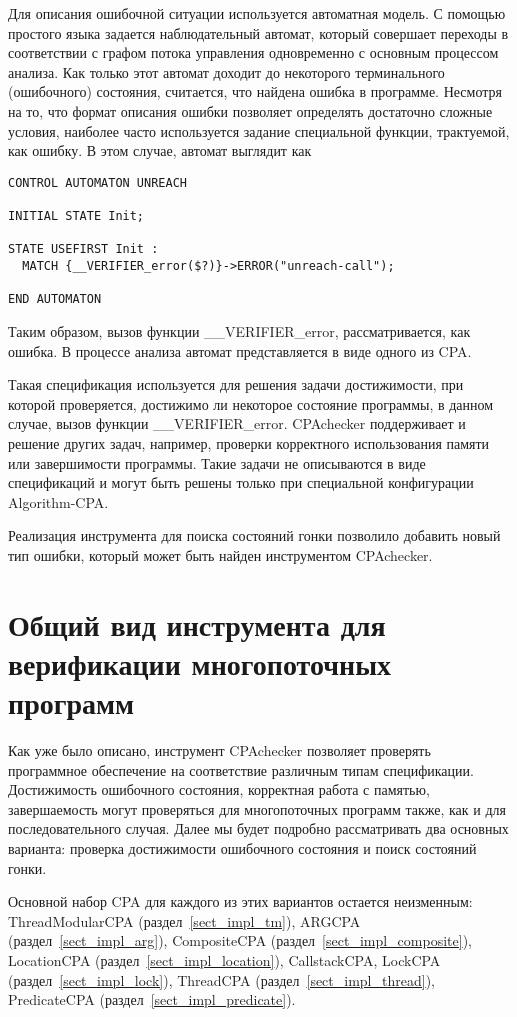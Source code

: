 Для описания ошибочной ситуации используется автоматная модель. 
С помощью простого языка задается наблюдательный автомат, который совершает переходы в соответствии с графом потока управления одновременно с основным процессом анализа. 
Как только этот автомат доходит до некоторого терминального (ошибочного) состояния, считается, что найдена ошибка в программе.
Несмотря на то, что формат описания ошибки позволяет определять достаточно сложные условия, наиболее часто используется задание специальной функции, трактуемой, как ошибку.
В этом случае, автомат выглядит как
\begin{verbatim}
CONTROL AUTOMATON UNREACH

INITIAL STATE Init;

STATE USEFIRST Init :
  MATCH {__VERIFIER_error($?)}->ERROR("unreach-call");

END AUTOMATON
\end{verbatim}
Таким образом, вызов функции \_\_VERIFIER\_error, рассматривается, как ошибка. 
В процессе анализа автомат представляется в виде одного из CPA.

Такая спецификация используется для решения задачи достижимости, при которой проверяется, достижимо ли некоторое состояние программы, в данном случае, вызов функции \_\_VERIFIER\_error.
CPAchecker поддерживает и решение других задач, например, проверки корректного использования памяти или завершимости программы.
Такие задачи не описываются в виде спецификаций и могут быть решены только при специальной конфигурации Algorithm-CPA.

Реализация инструмента для поиска состояний гонки позволило добавить новый тип ошибки, который может быть найден инструментом CPAchecker.

\section{Общий вид инструмента для верификации многопоточных программ}
\label{sect_impl_lockator}

Как уже было описано, инструмент CPAchecker позволяет проверять программное обеспечение на соответствие различным типам спецификации.
Достижимость ошибочного состояния, корректная работа с памятью, завершаемость могут проверяться для многопоточных программ также, как и для последовательного случая.
Далее мы будет подробно рассматривать два основных варианта: проверка достижимости ошибочного состояния и поиск состояний гонки.

Основной набор CPA для каждого из этих вариантов остается неизменным: ThreadModularCPA (раздел~\ref{sect_impl_tm}), ARGCPA (раздел~\ref{sect_impl_arg}), CompositeCPA (раздел~\ref{sect_impl_composite}), LocationCPA (раздел~\ref{sect_impl_location}), CallstackCPA, LockCPA (раздел~\ref{sect_impl_lock}), ThreadCPA (раздел~\ref{sect_impl_thread}), PredicateCPA (раздел~\ref{sect_impl_predicate}).

